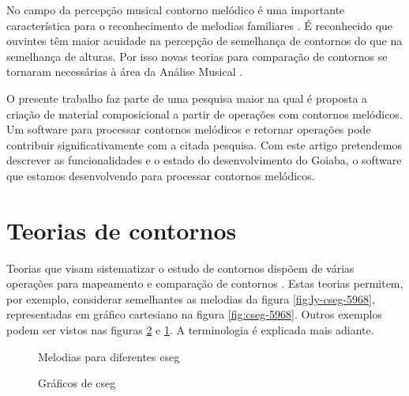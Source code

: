 No campo da percepção musical contorno melódico é uma importante
característica para o reconhecimento de melodias familiares \cite[p.
136]{dowling.ea86:music}. É reconhecido que ouvintes têm maior
acuidade na percepção de semelhança de contornos do que na semelhança
de alturas. Por isso novas teorias para comparação de contornos se
tornaram necessárias à área da Análise Musical
\cite[p. 226]{marvin.ea87:relating}.


O presente trabalho faz parte de uma pesquisa maior na qual é proposta
a criação de material composicional a partir de operações com
contornos melódicos. Um software para processar contornos melódicos e
retornar operações pode contribuir significativamente com a citada
pesquisa. Com este artigo pretendemos descrever as funcionalidades e o
estado do desenvolvimento do Goiaba, o software que estamos
desenvolvendo para processar contornos melódicos.

\section{Teorias de contornos}
\label{sec:teorias-de-contornos}

Teorias que visam sistematizar o estudo de contornos dispõem de várias
operações para mapeamento e comparação de contornos
\cite{friedmann85:methodology,friedmann87:response,morris87:composition,morris93:directions,marvin.ea87:relating,clifford95:contour,polansky.ea92:possible,quinn97:fuzzy,beard03:contour}. Estas
teorias permitem, por exemplo, considerar semelhantes as melodias da
figura \ref{fig:ly-cseg-5968}, representadas em gráfico cartesiano na
figura \ref{fig:cseg-5968}. Outros exemplos podem ser vistos nas
figuras \ref{fig:graficos-cseg} e \ref{fig:melodias-cseg}. A
terminologia é explicada mais adiante.

\begin{figure}
  \centering
  \caption{Melodias para diferentes cseg}
  \label{fig:melodias-cseg}
\end{figure}

\begin{figure}
  \centering
  \caption{Gráficos de cseg}
  \label{fig:graficos-cseg}
\end{figure}


